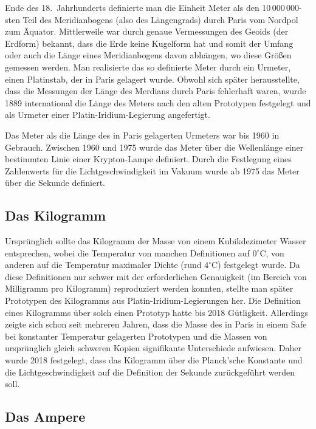 Ende des 18.\ Jahrhunderts definierte man die Einheit Meter als den 10\,000\,000-sten 
Teil des Meridianbogens (also des L\"angengrads) durch Paris vom Nordpol zum \"Aquator. Mittlerweile
war durch genaue Vermessungen des Geoids (der Erdform) bekannt, dass die Erde keine Kugelform
hat und somit der Umfang oder auch die L\"ange eines Meridianbogens davon abh\"angen, wo diese
Gr\"o\ss en gemessen werden. Man realisierte das so definierte Meter durch ein 
Urmeter, einen Platinstab,
der in Paris gelagert wurde. Obwohl sich sp\"ater herausstellte, dass die Messungen der L\"ange des
Merdians durch Paris fehlerhaft waren, wurde 1889 international die L\"ange des Meters nach den alten
Prototypen festgelegt und als Urmeter einer Platin-Iridium-Legierung angefertigt. 

Das Meter als die L\"ange des in Paris gelagerten Urmeters war bis 1960 in Gebrauch. Zwischen 1960
und 1975 wurde das Meter \"uber die Wellenl\"ange einer bestimmten Linie einer Krypton-Lampe
definiert. Durch die Festlegung eines Zahlenwerts f\"ur die Lichtgeschwindigkeit im Vakuum wurde ab 1975
das Meter \"uber die Sekunde definiert. 

\subsection{Das Kilogramm}

Urspr\"unglich sollte das Kilogramm 
der Masse von einem Kubikdezimeter Wasser entsprechen, wobei die Temperatur von manchen
Definitionen auf $0^\circ$C, von anderen auf die Temperatur maximaler Dichte (rund 
$4^\circ$C) festgelegt wurde. Da diese Definitionen nur schwer mit der erforderlichen Genauigkeit
(im Bereich von Milligramm pro Kilogramm) reproduziert werden konnten, stellte man sp\"ater
Prototypen des Kilogramms aus Platin-Iridium-Legierungen her. Die Definition eines Kilogramms
\"uber solch einen Prototyp hatte bis 2018 G\"utligkeit. Allerdings zeigte sich schon seit mehreren
Jahren, dass die Masse des in Paris in einem Safe bei konstanter Temperatur gelagerten Prototypen
und die Massen von urspr\"unglich gleich schweren Kopien signifikante Unterschiede aufwiesen. 
Daher wurde 2018 festgelegt, dass das Kilogramm \"uber die Planck'sche Konstante und die
Lichtgeschwindigkeit auf die Definition der Sekunde zur\"uckgef\"uhrt werden soll. 

\subsection{Das Ampere}

